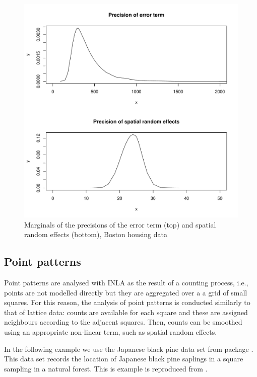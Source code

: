 \documentclass[article]{jss}
\begin{document}
\begin{figure}[h]
\begin{center}
\includegraphics{spatial_inla-004}
\end{center}
\caption{Marginals of the precisions of the error term (top) and
spatial random effects (bottom), Boston housing data}
\label{fig:marg1}
\end{figure}


\subsection{Point patterns}

Point patterns are analysed with INLA as the result of a counting process,
i.e., points are not modelled directly but they are aggregated over a a grid
of small squares. For this reason, the analysis of point patterns is conducted
similarly to that of lattice data: counts are available for each square and 
these are assigned neighbours according to the adjacent squares. Then, counts
can be smoothed using an appropriate non-linear term, such as spatial
random effects.

In the following example we use the Japanese black pine data set from
 package . This data set records the location of
Japanese black pine saplings in a square sampling in a natural forest.  This
is example is reproduced from \citet{GomezRubioetal:2013}.
\end{document}

